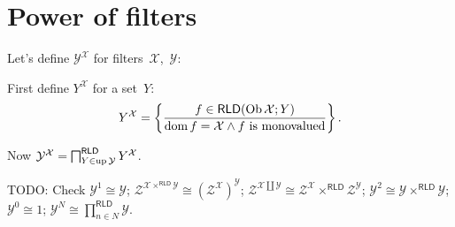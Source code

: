 \chapter{Power of filters}

Let's define $\mathcal{Y}^{\mathcal{X}}$ for filters~$\mathcal{X}$,~$\mathcal{Y}$:

First define $Y^{\mathcal{X}}$ for a set~$Y$:
\[ Y^{\mathcal{X}} = \left\{ \frac{ f \in \mathsf{RLD} (\operatorname{Ob} \mathcal{X}
   ; Y) }{ \operatorname{dom} f = \mathcal{X} \wedge f\text{ is monovalued} }\right\} . \]

Now $\mathcal{Y}^{\mathcal{X}} = \bigsqcap^{\mathsf{RLD}}_{Y \in
\operatorname{up} \mathcal{Y}} Y^{\mathcal{X}}$.

TODO: Check $\mathcal{Y}^1 \cong \mathcal{Y}$; $\mathcal{Z}^{\mathcal{X}
\times^{\mathsf{RLD}} \mathcal{Y}} \cong
(\mathcal{Z}^{\mathcal{X}})^{\mathcal{Y}}$; $\mathcal{Z}^{\mathcal{X} \amalg
\mathcal{Y}} \cong \mathcal{Z}^{\mathcal{X}} \times^{\mathsf{RLD}}
\mathcal{Z}^{\mathcal{Y}}$; $\mathcal{Y}^2 \cong \mathcal{Y}\times^{\mathsf{RLD}}\mathcal{Y}$;
$\mathcal{Y}^0 \cong 1$; $\mathcal{Y}^N \cong \prod^{\mathsf{RLD}}_{n\in N}\mathcal{Y}$.
